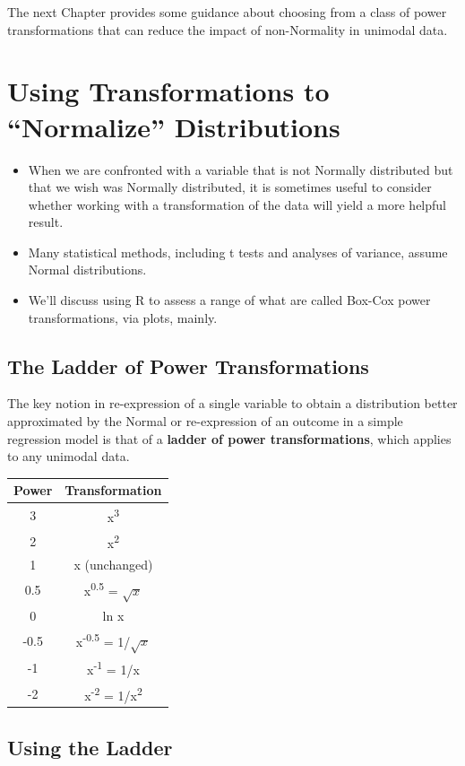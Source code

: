 \documentclass[
]{book}
\providecommand{\tightlist}{%
  \setlength{\itemsep}{0pt}\setlength{\parskip}{0pt}}
\begin{document}
The next Chapter provides some guidance about choosing from a class of power transformations that can reduce the impact of non-Normality in unimodal data.

\hypertarget{using-transformations-to-normalize-distributions}{%
\chapter{Using Transformations to ``Normalize'' Distributions}\label{using-transformations-to-normalize-distributions}}

\begin{itemize}
\tightlist
\item
  When we are confronted with a variable that is not Normally distributed but that we wish was Normally distributed, it is sometimes useful to consider whether working with a transformation of the data will yield a more helpful result.
\item
  Many statistical methods, including t tests and analyses of variance, assume Normal distributions.
\item
  We'll discuss using R to assess a range of what are called Box-Cox power transformations, via plots, mainly.
\end{itemize}

\hypertarget{the-ladder-of-power-transformations}{%
\section{The Ladder of Power Transformations}\label{the-ladder-of-power-transformations}}

The key notion in re-expression of a single variable to obtain a distribution better approximated by the Normal or re-expression of an outcome in a simple regression model is that of a \textbf{ladder of power transformations}, which applies to any unimodal data.

\begin{longtable}[]{@{}cc@{}}
\toprule
Power & Transformation\tabularnewline
\midrule
\endhead
3 & x\textsuperscript{3}\tabularnewline
2 & x\textsuperscript{2}\tabularnewline
1 & x (unchanged)\tabularnewline
0.5 & x\textsuperscript{0.5} = \(\sqrt{x}\)\tabularnewline
0 & ln x\tabularnewline
-0.5 & x\textsuperscript{-0.5} = 1/\(\sqrt{x}\)\tabularnewline
-1 & x\textsuperscript{-1} = 1/x\tabularnewline
-2 & x\textsuperscript{-2} = 1/x\textsuperscript{2}\tabularnewline
\bottomrule
\end{longtable}

\hypertarget{using-the-ladder}{%
\section{Using the Ladder}\label{using-the-ladder}}
\end{document}
